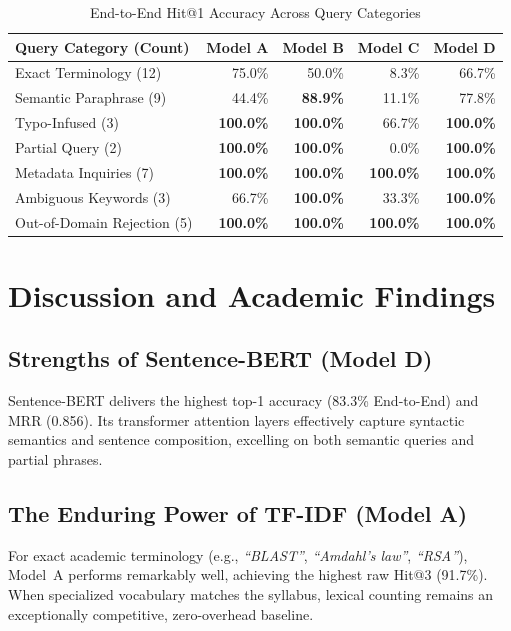 \documentclass[12pt,a4paper]{report}
\begin{document}
\begin{table}[H]
    \centering
    \caption{End-to-End Hit@1 Accuracy Across Query Categories}
    \label{tab:category_results}
    \begin{tabularx}{\textwidth}{lrrrr}
        \toprule
        \textbf{Query Category (Count)} & \textbf{Model A} & \textbf{Model B} & \textbf{Model C} & \textbf{Model D} \\
        \midrule
        Exact Terminology (12) & 75.0\% & 50.0\% & 8.3\% & 66.7\% \\
        Semantic Paraphrase (9) & 44.4\% & \textbf{88.9\%} & 11.1\% & 77.8\% \\
        Typo-Infused (3) & \textbf{100.0\%} & \textbf{100.0\%} & 66.7\% & \textbf{100.0\%} \\
        Partial Query (2) & \textbf{100.0\%} & \textbf{100.0\%} & 0.0\% & \textbf{100.0\%} \\
        Metadata Inquiries (7) & \textbf{100.0\%} & \textbf{100.0\%} & \textbf{100.0\%} & \textbf{100.0\%} \\
        Ambiguous Keywords (3) & 66.7\% & \textbf{100.0\%} & 33.3\% & \textbf{100.0\%} \\
        Out-of-Domain Rejection (5) & \textbf{100.0\%} & \textbf{100.0\%} & \textbf{100.0\%} & \textbf{100.0\%} \\
        \bottomrule
    \end{tabularx}
\end{table}

\section{Discussion and Academic Findings}
\subsection{Strengths of Sentence-BERT (Model D)}
Sentence-BERT delivers the highest top-1 accuracy (83.3\% End-to-End) and MRR (0.856). Its transformer attention layers effectively capture syntactic semantics and sentence composition, excelling on both semantic queries and partial phrases.

\subsection{The Enduring Power of TF-IDF (Model A)}
For exact academic terminology (e.g., \textit{``BLAST''}, \textit{``Amdahl's law''}, \textit{``RSA''}), Model~A performs remarkably well, achieving the highest raw Hit@3 (91.7\%). When specialized vocabulary matches the syllabus, lexical counting remains an exceptionally competitive, zero-overhead baseline.
\end{document}

